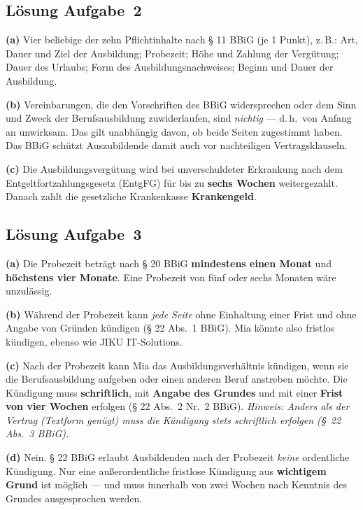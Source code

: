\documentclass[11pt, a4paper]{article}
\begin{document}
\subsection*{Lösung Aufgabe~2}
\begin{loesung}
\textbf{(a)} Vier beliebige der zehn Pflichtinhalte nach § 11 BBiG (je 1 Punkt), z.\,B.:
Art, Dauer und Ziel der Ausbildung; Probezeit; Höhe und Zahlung der Vergütung; Dauer des
Urlaubs; Form des Ausbildungsnachweises; Beginn und Dauer der Ausbildung.

\textbf{(b)} Vereinbarungen, die den Vorschriften des BBiG widersprechen oder dem Sinn und
Zweck der Berufsausbildung zuwiderlaufen, sind \emph{nichtig} --- d.\,h.\ von Anfang an
unwirksam. Das gilt unabhängig davon, ob beide Seiten zugestimmt haben. Das BBiG schützt
Auszubildende damit auch vor nachteiligen Vertragsklauseln.

\textbf{(c)} Die Ausbildungsvergütung wird bei unverschuldeter Erkrankung nach dem
Entgeltfortzahlungsgesetz (EntgFG) für bis zu \textbf{sechs Wochen} weitergezahlt.
Danach zahlt die gesetzliche Krankenkasse \textbf{Krankengeld}.
\end{loesung}

\subsection*{Lösung Aufgabe~3}
\begin{loesung}
\textbf{(a)} Die Probezeit beträgt nach § 20 BBiG \textbf{mindestens einen Monat} und
\textbf{höchstens vier Monate}. Eine Probezeit von fünf oder sechs Monaten wäre unzulässig.

\textbf{(b)} Während der Probezeit kann \emph{jede Seite} ohne Einhaltung einer Frist
und ohne Angabe von Gründen kündigen (§ 22 Abs.~1 BBiG). Mia könnte also fristlos
kündigen, ebenso wie JIKU IT-Solutions.

\textbf{(c)} Nach der Probezeit kann Mia das Ausbildungsverhältnis kündigen, wenn sie
die Berufsausbildung aufgeben oder einen anderen Beruf anstreben möchte. Die Kündigung
muss \textbf{schriftlich}, mit \textbf{Angabe des Grundes} und mit einer
\textbf{Frist von vier Wochen} erfolgen (§ 22 Abs.~2 Nr.~2 BBiG). \textit{Hinweis: Anders
als der Vertrag (Textform genügt) muss die Kündigung stets schriftlich erfolgen
(§~22 Abs.~3 BBiG).}

\textbf{(d)} Nein. § 22 BBiG erlaubt Ausbildenden nach der Probezeit \emph{keine} ordentliche
Kündigung. Nur eine außerordentliche fristlose Kündigung aus \textbf{wichtigem Grund} ist
möglich --- und muss innerhalb von zwei Wochen nach Kenntnis des Grundes ausgesprochen werden.
\end{loesung}
\end{document}
